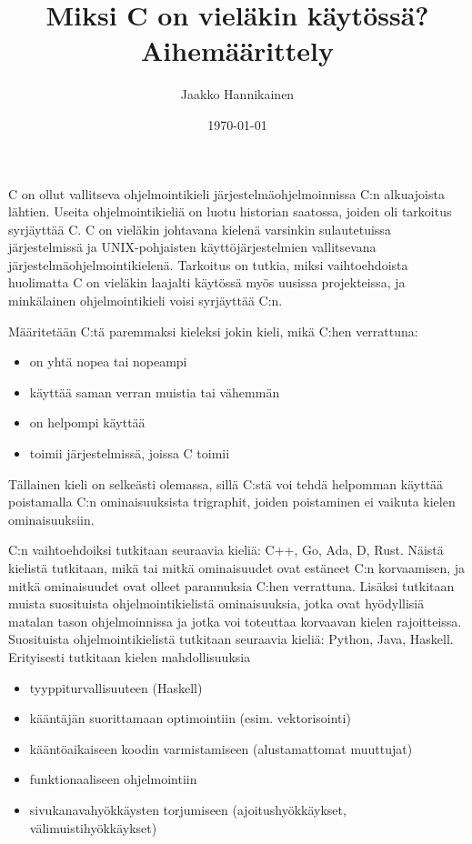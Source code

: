 \documentclass{article}
\title{Miksi C on vieläkin käytössä? \\ {\large Aihemäärittely}}
\author{
    Jaakko Hannikainen
}
\date{\today}
\begin{document}
\maketitle

C on ollut vallitseva ohjelmointikieli järjestelmäohjelmoinnissa C:n
alkuajoista lähtien. Useita ohjelmointikieliä on luotu historian saatossa,
joiden oli tarkoitus syrjäyttää C. C on vieläkin johtavana kielenä varsinkin
sulautetuissa järjestelmissä ja UNIX-pohjaisten käyttöjärjestelmien
vallitsevana järjestelmäohjelmointikielenä. Tarkoitus on tutkia, miksi
vaihtoehdoista huolimatta C on vieläkin laajalti käytössä myös uusissa
projekteissa, ja minkälainen ohjelmointikieli voisi syrjäyttää C:n.

Määritetään C:tä paremmaksi kieleksi jokin kieli, mikä C:hen verrattuna:

\begin{itemize}
    \item on yhtä nopea tai nopeampi
    \item käyttää saman verran muistia tai vähemmän
    \item on helpompi käyttää
    \item toimii järjestelmissä, joissa C toimii
\end{itemize}

Tällainen kieli on selkeästi olemassa, sillä C:stä voi tehdä helpomman käyttää
poistamalla C:n ominaisuuksista trigraphit, joiden poistaminen ei vaikuta
kielen ominaisuuksiin.

C:n vaihtoehdoiksi tutkitaan seuraavia kieliä: C++, Go, Ada, D, Rust. Näistä
kielistä tutkitaan, mikä tai mitkä ominaisuudet ovat estäneet C:n korvaamisen,
ja mitkä ominaisuudet ovat olleet parannuksia C:hen verrattuna. Lisäksi
tutkitaan muista suosituista ohjelmointikielistä ominaisuuksia, jotka ovat
hyödyllisiä matalan tason ohjelmoinnissa ja jotka voi toteuttaa korvaavan
kielen rajoitteissa. Suosituista ohjelmointikielistä tutkitaan seuraavia
kieliä: Python, Java, Haskell. Erityisesti tutkitaan kielen mahdollisuuksia

\begin{itemize}
    \item tyyppiturvallisuuteen
        (Haskell)
    \item kääntäjän suorittamaan optimointiin
        (esim. vektorisointi)
    \item kääntöaikaiseen koodin varmistamiseen
        (alustamattomat muuttujat)
    \item funktionaaliseen ohjelmointiin
    \item sivukanavahyökkäysten torjumiseen
        (ajoitushyökkäykset, välimuistihyökkäykset)
\end{itemize}
\end{document}
